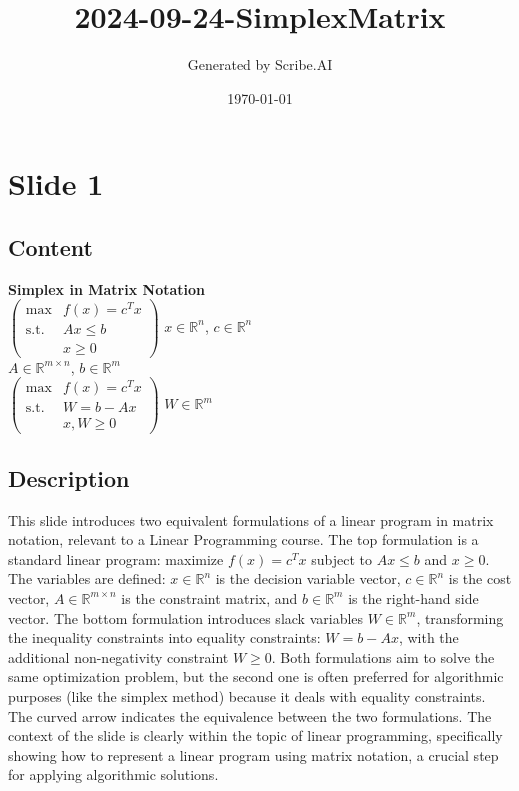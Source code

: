 \documentclass{article}%
\title{2024{-}09{-}24{-}SimplexMatrix}%
\author{Generated by Scribe.AI}%
\date{\today}%
\begin{document}
%
\normalsize%
\maketitle%
\section{Slide 1}%
\label{sec:Slide1}%
\subsection{Content}%

\textbf{Simplex in Matrix Notation} \\
$\begin{pmatrix}
\max & f(x) = c^T x \\
\text{s.t.} & Ax \le b \\
& x \ge 0
\end{pmatrix}$
\qquad $x \in \mathbb{R}^n$, $c \in \mathbb{R}^n$ \\
\qquad $A \in \mathbb{R}^{m \times n}$, $b \in \mathbb{R}^m$ \\
$\begin{pmatrix}
\max & f(x) = c^T x \\
\text{s.t.} & W = b - Ax \\
& x, W \ge 0
\end{pmatrix}$
\qquad $W \in \mathbb{R}^m$
%
\subsection{Description}%
This slide introduces two equivalent formulations of a linear program in matrix notation, relevant to a Linear Programming course. The top formulation is a standard linear program: maximize $f(x) = c^T x$ subject to $Ax \le b$ and $x \ge 0$.  The variables are defined: $x \in \mathbb{R}^n$ is the decision variable vector, $c \in \mathbb{R}^n$ is the cost vector, $A \in \mathbb{R}^{m \times n}$ is the constraint matrix, and $b \in \mathbb{R}^m$ is the right-hand side vector. The bottom formulation introduces slack variables $W \in \mathbb{R}^m$, transforming the inequality constraints into equality constraints: $W = b - Ax$, with the additional non-negativity constraint $W \ge 0$.  Both formulations aim to solve the same optimization problem, but the second one is often preferred for algorithmic purposes (like the simplex method) because it deals with equality constraints. The curved arrow indicates the equivalence between the two formulations. The context of the slide is clearly within the topic of linear programming, specifically showing how to represent a linear program using matrix notation, a crucial step for applying algorithmic solutions.%
\end{document}
